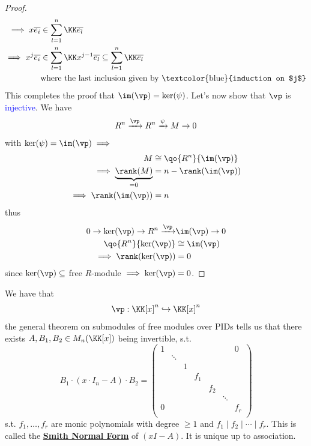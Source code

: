 \begin{proof}
\[\begin{aligned}
			\implies x\overline{e_i}                                   & \in \sum_{l=1}^n \KK \overline{e_l}                                         \\
			\implies x^j \overline{e_i}                                & \in \sum_{l=1}^n \KK x^{j-1}\overline{e_l} \subseteq \sum_{l=1}^n
			\KK \overline{e_l}                                                                                                                       \\
			                                                           & \text{where the last inclusion given by \textcolor{blue}{induction on $j$}}
		\end{aligned}
	\]
	This completes the proof that \( \im(\vp) = \ker(\psi) \). Let's now show that \( \vp \) is
	\textcolor{blue}{injective}. We have
	\[
		R^n \xrightarrow{\vp} R^n \xrightarrow{\psi} M \to 0
	\]
	with \( \ker(\psi) = \im(\vp) \implies \)
	\[
		\begin{aligned}
			M                                   & \cong \qo{R^n}{\im(\vp)} \\
			\implies \underbrace{\rank(M)}_{=0} & = n - \rank(\im(\vp))    \\
			\implies \rank(\im(\vp))            & = n                      \\
		\end{aligned}
	\]
	thus
	\[
		\begin{aligned}
			0                          \to \ker(\vp) \to R^n \xrightarrow{\vp} & \im(\vp) \to 0 \\
			\qo{R^n}{\ker(\vp)}                                                & \cong \im(\vp) \\
			\implies \rank(\ker(\vp))                                          & = 0            \\
		\end{aligned}
	\]
	since \( \ker(\vp) \subseteq  \) free \( R \)-module \( \implies \ker(\vp) = 0 \).
\end{proof}
We have that
\[
	\vp: \KK[x]^n \hookrightarrow \KK[x]^n
\]
the general theorem on submodules of free modules over PIDs tells us that there exists \( A, B_1,
B_2 \in
M_n(\KK[x]) \) being invertible, s.t.
\[
	B_1 \cdot (x \cdot I_n - A ) \cdot B_2 =
	\begin{pmatrix}
		1 &        &   &     &     &        & 0   \\
		  & \ddots &   &     &     &        &     \\
		  &        & 1 &     &     &        &     \\
		  &        &   & f_1 &     &        &     \\
		  &        &   &     & f_2 &        &     \\
		  &        &   &     &     & \ddots &     \\
		0 &        &   &     &     &        & f_r \\
	\end{pmatrix}
\]
s.t. \( f_1,\ldots, f_r \) are monic polynomials with degree \( \geq 1 \) and \( f_1 \mid f_2 \mid
\cdots \mid f_r \). This is called the \underline{\textbf{Smith Normal Form}} of \( (xI - A) \). It
is unique up to association.
